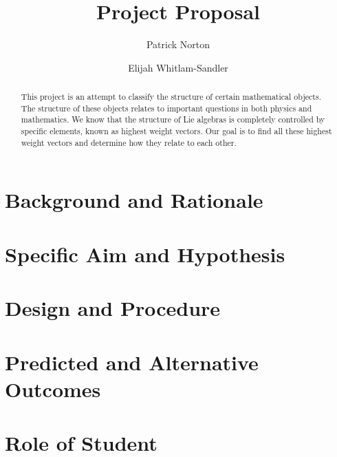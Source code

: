

\usepackage{biblatex}
\usepackage{microtype}


\title{Project Proposal}
\author{Patrick Norton \and Elijah Whitlam-Sandler}



\maketitle

\begin{abstract}
  This project is an attempt to classify the structure of certain mathematical
  objects. %
  The structure of these objects relates to important questions in both
  physics and mathematics. %
  We know that the structure of Lie algebras is completely controlled by
  specific elements, known as highest weight vectors. Our goal is to find all
  these highest weight vectors and determine how they relate to each other.
\end{abstract}

\section{Background and Rationale}


\section{Specific Aim and Hypothesis}


\section{Design and Procedure}

\section{Predicted and Alternative Outcomes}

\section{Role of Student}


